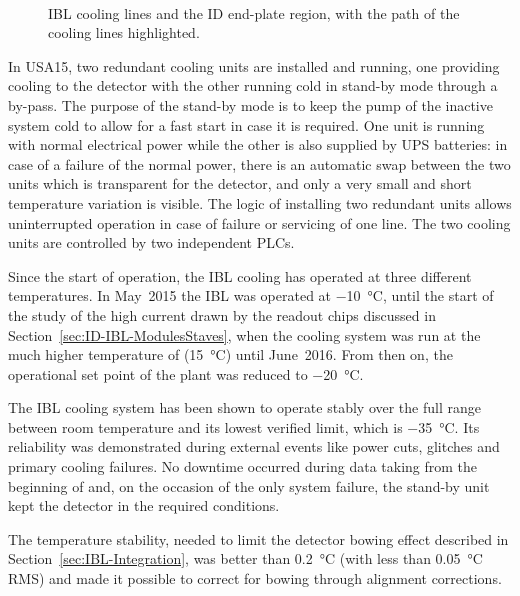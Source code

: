 \documentclass[cernpreprint, atlasdraft=false, UKenglish,british,orcidlogo, texmf, orcidlogo]{atlasdoc}
\begin{document}
\begin{figure}[htbp]
\centering
{}\hspace{0.5 cm}
 \\
\caption{\protect{} \gls{IBL} cooling lines and \protect{} the \gls{ID} end-plate region, with the path of the cooling lines highlighted.}
\label{fig:IBL_CO2CoolingLines}
\end{figure}
 
In \gls{USA15}, two redundant cooling units are installed and running, one providing cooling to the detector
with the other running cold in stand-by mode through a by-pass. The purpose of the stand-by mode is to keep the pump
of the inactive system cold to allow for a fast start in case it is required.
One unit is running with normal electrical power while the other is also supplied by \gls{UPS} batteries:
in case of a failure of the normal power, there is an automatic swap between the two units which is
transparent for the detector, and only a very small and short temperature variation is visible.
The logic of installing two redundant units allows uninterrupted operation in case of
failure or servicing of one line. The two cooling units are controlled by two independent \glspl{PLC}.
 
Since the start of operation, the \gls{IBL} cooling has operated at three different temperatures. In May~2015 the \gls{IBL} was operated at \SI{-10}{\degreeCelsius}, until the start of the study of the high current drawn by the readout chips discussed in Section~\ref{sec:ID-IBL-ModulesStaves},
when the cooling system was run at the much higher temperature of (\SI[retain-explicit-plus]{+15}{\degreeCelsius}) until June~2016. From then on, the operational set point of the plant was reduced to \SI{-20}{\degreeCelsius}.
 
The \gls{IBL} cooling system has been shown to operate stably over the full range between room temperature and its lowest verified limit, which is \SI{-35}{\degreeCelsius}.
Its reliability was demonstrated during external events like power cuts, glitches and primary cooling failures. No downtime occurred during data taking from the beginning of \RunTwo and, on the occasion of the only system failure, the stand-by unit kept the detector in the required conditions.
 
The temperature stability, needed to limit the detector bowing effect described in Section~\ref{sec:IBL-Integration},
was better than \SI{0.2}{\degreeCelsius}  (with less than \SI{0.05}{\degreeCelsius} RMS) and made it possible to correct for bowing through alignment corrections.
 
\end{document}
